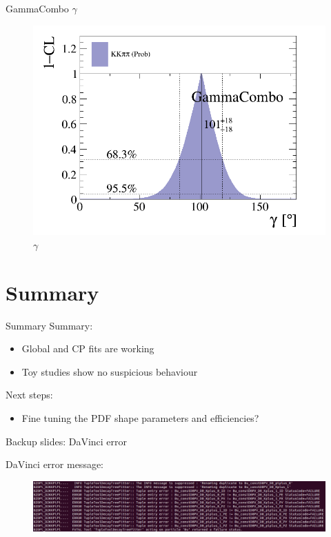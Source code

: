 \documentclass{beamer}
\begin{document}
\begin{frame}{GammaCombo $\gamma$}
  \begin{figure}[H]
    \centering
    \includegraphics[width=0.8\linewidth]{Plots/cartesian_cartesian_gamma.png}
    \caption{$\gamma$}
  \end{figure}
\end{frame}

\section{Summary}
\begin{frame}{Summary}
  Summary:
  \begin{itemize}
    \item{Global and CP fits are working}
    \item{Toy studies show no suspicious behaviour}
  \end{itemize}
  Next steps:
  \begin{itemize}
    \item{Fine tuning the PDF shape parameters and efficiencies?}
  \end{itemize}
\end{frame}

\begin{frame}{Backup slides: DaVinci error}
  \begin{center}
    DaVinci error message:
  \end{center}
  \begin{figure}
    \includegraphics[width = 1\textwidth]{DaVinciError.png}
  \end{figure}
\end{frame}
\end{document}
